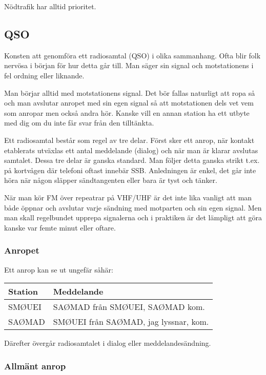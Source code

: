 Nödtrafik har alltid prioritet.

\subsection{QSO}

Konsten att genomföra ett radiosamtal (QSO) i olika sammanhang. Ofta
blir folk nervösa i början för hur detta går till. Man säger sin
signal och motstationens i fel ordning eller liknande.

Man börjar alltid med motstationens signal. Det bör fallas naturligt
att ropa så och man avslutar anropet med sin egen signal så att
motstationen dels vet vem som anropar men också andra hör. Kanske vill
en annan station ha ett utbyte med dig om du inte får svar från den
tilltänkta.

Ett radiosamtal består som regel av tre delar. Först sker ett anrop, när kontakt etablerats utväxlas ett antal meddelande (dialog) och när man är klarar avslutas samtalet. Dessa tre delar är ganska standard. Man följer detta ganska strikt t.ex. på kortvågen där telefoni oftast innebär SSB. Anledningen är enkel, det går inte höra när någon släpper sändtangenten eller bara är tyst och tänker.

När man kör FM över repeatrar på VHF/UHF är det inte lika vanligt att man både öppnar och avslutar varje sändning med motparten och sin egen signal. Men man skall regelbundet upprepa signalerna och i praktiken är det lämpligt att göra kanske var femte minut eller oftare.

\subsubsection{Anropet}

Ett anrop kan se ut ungefär såhär:

\begin{tabular}{ll}
	Station & Meddelande                            \\ \hline
	SMØUEI  & SAØMAD från SMØUEI, SAØMAD kom.       \\
	SAØMAD  & SMØUEI från SAØMAD, jag lyssnar, kom.
\end{tabular}

Därefter övergår radiosamtalet i dialog eller meddelandesändning.

\subsubsection{Allmänt anrop}

